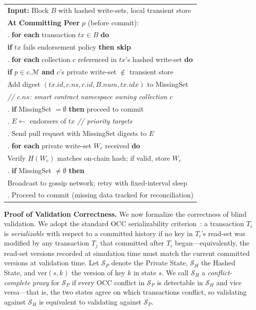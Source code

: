 \begin{algorithm}[h]
\centering
\small
\begin{tabular}{|p{}|}
\hline
\textbf{Input:} Block $B$ with hashed write-sets, local transient store \\[3pt]
\textbf{At Committing Peer} $p$ (before commit): \\
\quad 1. \textbf{for each} transaction $tx \in B$ \textbf{do} \\
\quad\quad\quad \textbf{if} $tx$ fails endorsement policy \textbf{then skip} \\
\quad 2. \textbf{for each} collection $c$ referenced in $tx$'s hashed write-set \textbf{do} \\
\quad\quad\quad \textbf{if} $p \in c.\mathcal{M}$ \textbf{and} $c$'s private write-set $\notin$ transient store \\
\quad\quad\quad\quad\quad Add digest $(tx.id, c.\mathit{ns}, c.id, B.num, tx.idx)$ to MissingSet \\
\quad\quad\quad\quad\quad \textit{// $c.\mathit{ns}$: smart contract namespace owning collection $c$} \\
\quad 3. \textbf{if} MissingSet $= \emptyset$ \textbf{then} proceed to commit \\
\quad 4. $E \leftarrow$ endorsers of $tx$ \quad\quad\quad \textit{// priority targets} \\
\quad 5. Send pull request with MissingSet digests to $E$ \\
\quad 6. \textbf{for each} private write-set $W_c$ received \textbf{do} \\
\quad\quad\quad Verify $H(W_c)$ matches on-chain hash; if valid, store $W_c$ \\
\quad 7. \textbf{if} MissingSet $\neq \emptyset$ \textbf{then} \\
\quad\quad\quad Broadcast to gossip network; retry with fixed-interval sleep \\
\quad 8. Proceed to commit (missing data tracked for reconciliation) \\
\hline
\end{tabular}
\caption{Reactive retrieval protocol.}
\label{alg:retrieval}
\end{algorithm}

\noindent\textbf{Proof of Validation Correctness.}
We now formalize the correctness of blind validation. We adopt the standard OCC serializability criterion~\cite{occ}: a transaction $T_i$ is \textit{serializable} with respect to a committed history if no key in $T_i$'s read-set was modified by any transaction $T_j$ that committed after $T_i$ began---equivalently, the read-set versions recorded at simulation time must match the current committed versions at validation time. Let $\mathcal{S}_P$ denote the Private State, $\mathcal{S}_H$ the Hashed State, and $\text{ver}(s, k)$ the version of key $k$ in state $s$. We call $\mathcal{S}_H$ a \textit{conflict-complete proxy} for $\mathcal{S}_P$ if every OCC conflict in $\mathcal{S}_P$ is detectable in $\mathcal{S}_H$ and vice versa---that is, the two states agree on which transactions conflict, so validating against $\mathcal{S}_H$ is equivalent to validating against $\mathcal{S}_P$.

